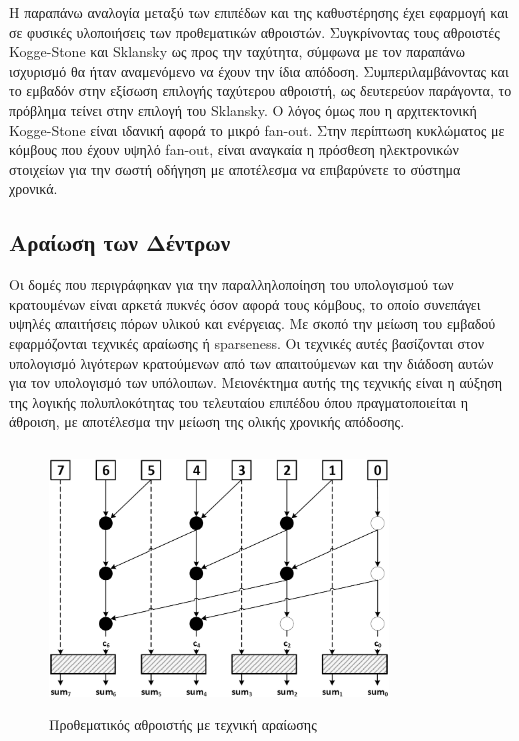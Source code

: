 Η παραπάνω αναλογία μεταξύ των επιπέδων και της καθυστέρησης έχει εφαρμογή και σε φυσικές
υλοποιήσεις των προθεματικών αθροιστών. Συγκρίνοντας τους αθροιστές Kogge-Stone και Sklansky ως
προς την ταχύτητα, σύμφωνα με τον παραπάνω ισχυρισμό θα ήταν αναμενόμενο να έχουν την ίδια 
απόδοση. Συμπεριλαμβάνοντας και το εμβαδόν στην εξίσωση επιλογής ταχύτερου αθροιστή, ως δευτερεύον
παράγοντα, το πρόβλημα τείνει στην επιλογή του Sklansky. Ο λόγος όμως που η αρχιτεκτονική 
Kogge-Stone είναι ιδανική αφορά το μικρό fan-out. Στην περίπτωση κυκλώματος με κόμβους
που έχουν υψηλό fan-out, είναι αναγκαία η πρόσθεση ηλεκτρονικών στοιχείων για την σωστή οδήγηση
με αποτέλεσμα να επιβαρύνετε το σύστημα χρονικά.














\subsection{Αραίωση των Δέντρων}
\label{subsection:prefix_sparseness}
Οι δομές που περιγράφηκαν για την παραλληλοποίηση του υπολογισμού των κρατουμένων 
είναι αρκετά πυκνές όσον αφορά τους κόμβους, το οποίο συνεπάγει υψηλές απαιτήσεις πόρων υλικού και ενέργειας. Με σκοπό την μείωση του εμβαδού εφαρμόζονται τεχνικές αραίωσης ή sparseness. Οι τεχνικές αυτές βασίζονται στον υπολογισμό λιγότερων κρατούμενων από των απαιτούμενων και την διάδοση αυτών για τον υπολογισμό των υπόλοιπων. Μειονέκτημα αυτής της τεχνικής είναι η αύξηση της λογικής πολυπλοκότητας του τελευταίου επιπέδου όπου πραγματοποιείται η άθροιση, με αποτέλεσμα την μείωση της ολικής χρονικής απόδοσης.

\begin{figure}[H]
    \centering
    \includegraphics[height=7cm,width=9cm]{Pictures/prefix_sparse_2.png}
    \caption{Προθεματικός αθροιστής με τεχνική αραίωσης}
    \label{fig:prefix_sparse_2}
\end{figure}

